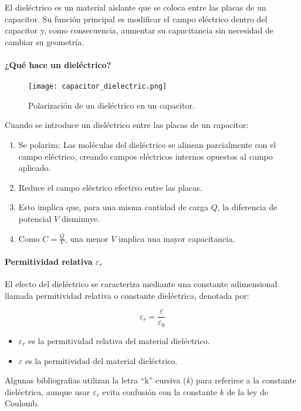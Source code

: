 El dieléctrico es un material aislante que se coloca entre las placas de un capacitor. Su función principal es modificar el campo eléctrico dentro del capacitor y, como consecuencia, aumentar su capacitancia sin necesidad de cambiar su geometría.

\paragraph{¿Qué hace un dieléctrico?}

\begin{figure}[ht]
    \centering
    \texttt{[image: capacitor\_dielectric.png]}
    \caption{Polarización de un dieléctrico en un capacitor.}
    \label{fig:capacitor_dieletrico}
\end{figure}
Cuando se introduce un dieléctrico entre las placas de un capacitor:
\begin{enumerate}
    \item Se polariza: Las moléculas del dieléctrico se alinean parcialmente con el campo eléctrico, creando campos eléctricos internos opuestos al campo aplicado.
    \item Reduce el campo eléctrico efectivo entre las placas.
    \item Esto implica que, para una misma cantidad de carga \( Q \), la diferencia de potencial \( V \) disminuye.
    \item Como \( C = \frac{Q}{V} \), una menor \( V \) implica una mayor capacitancia.
\end{enumerate}
\newpage
\paragraph{Permitividad relativa \( \varepsilon_r \)}

El efecto del dieléctrico se caracteriza mediante una constante adimensional llamada permitividad relativa o constante dieléctrica, denotada por:

\[
\varepsilon_r = \frac{\varepsilon}{\varepsilon_0}
\]

\begin{itemize}
    \item \( \varepsilon_r \) es la permitividad relativa del material dieléctrico.
    \item \( \varepsilon \) es la permitividad del material dieléctrico.
\end{itemize}

Algunas bibliografias utilizan la letra ``k'' cursiva (\textit{k}) para referirse a la constante dieléctrica, aunque usar \( \varepsilon_r \) evita confusión con la constante \(k\) d\textsl{}e la ley de Coulomb.

